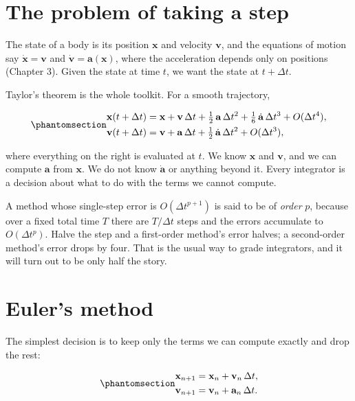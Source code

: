 \documentclass[
  10.5pt,
  letterpaper,
]{scrbook}
\theoremstyle{plain}
\theoremstyle{remark}
\begin{document}
\section{The problem of taking a
step}\label{the-problem-of-taking-a-step}

The state of a body is its position \(\mathbf{x}\) and velocity
\(\mathbf{v}\), and the equations of motion say
\(\dot{\mathbf{x}} = \mathbf{v}\) and
\(\dot{\mathbf{v}} = \mathbf{a}(\mathbf{x})\), where the acceleration
depends only on positions (Chapter 3). Given the state at time \(t\), we
want the state at \(t + \Delta t\).

Taylor's theorem is the whole toolkit. For a smooth trajectory,

\begin{equation}\protect\phantomsection\label{eq-taylor}{
\begin{aligned}
\mathbf{x}(t+\Delta t) &= \mathbf{x} + \mathbf{v}\,\Delta t + \tfrac12\,\mathbf{a}\,\Delta t^2 + \tfrac16\,\dot{\mathbf{a}}\,\Delta t^3 + O(\Delta t^4), \\
\mathbf{v}(t+\Delta t) &= \mathbf{v} + \mathbf{a}\,\Delta t + \tfrac12\,\dot{\mathbf{a}}\,\Delta t^2 + O(\Delta t^3),
\end{aligned}
}\end{equation}

where everything on the right is evaluated at \(t\). We know
\(\mathbf{x}\) and \(\mathbf{v}\), and we can compute \(\mathbf{a}\)
from \(\mathbf{x}\). We do not know \(\dot{\mathbf{a}}\) or anything
beyond it. Every integrator is a decision about what to do with the
terms we cannot compute.

A method whose single-step error is \(O(\Delta t^{p+1})\) is said to be
of \emph{order} \(p\), because over a fixed total time \(T\) there are
\(T/\Delta t\) steps and the errors accumulate to \(O(\Delta t^p)\).
Halve the step and a first-order method's error halves; a second-order
method's error drops by four. That is the usual way to grade
integrators, and it will turn out to be only half the story.

\section{Euler's method}\label{eulers-method}

The simplest decision is to keep only the terms we can compute exactly
and drop the rest:

\begin{equation}\protect\phantomsection\label{eq-euler}{
\begin{aligned}
\mathbf{x}_{n+1} &= \mathbf{x}_n + \mathbf{v}_n\,\Delta t, \\
\mathbf{v}_{n+1} &= \mathbf{v}_n + \mathbf{a}_n\,\Delta t.
\end{aligned}
}\end{equation}
\end{document}
